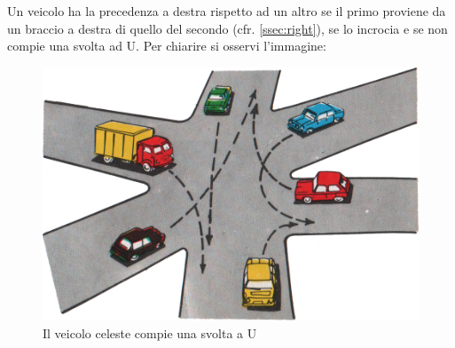 Un veicolo ha la precedenza a destra rispetto ad un altro se il primo proviene da un braccio a destra di quello del secondo (cfr. \ref{ssec:right}), se lo incrocia e se non compie una svolta ad U. Per chiarire si osservi l'immagine:

\begin{figure}[!htb]
	\centering
	\includegraphics[width=.5\textwidth]{images/contact/uturn}
	\caption{Il veicolo celeste compie una svolta a U}
\end{figure}


